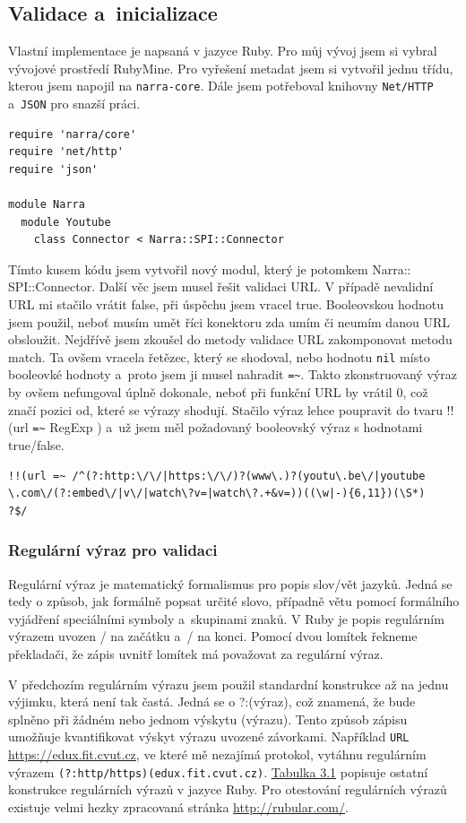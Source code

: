 \subsection{Validace a~inicializace}
\par Vlastní implementace je napsaná v jazyce Ruby. Pro můj vývoj jsem si vybral vývojové prostředí RubyMine. Pro vyřešení metadat jsem si vytvořil jednu třídu, kterou jsem napojil na \texttt{narra-core}. Dále jsem potřeboval knihovny \texttt{Net/HTTP} a~\texttt{JSON} pro snazší práci.
\begin{verbatim}
require 'narra/core'
require 'net/http'
require 'json'

module Narra
  module Youtube
    class Connector < Narra::SPI::Connector
\end{verbatim}
\par Tímto kusem kódu jsem vytvořil nový modul, který je potomkem Narra::\\SPI::Connector. Další věc jsem musel řešit validaci URL. V případě nevalidní URL mi stačilo vrátit false, při úspěchu jsem vracel true. Booleovskou hodnotu jsem použil, neboť musím umět říci konektoru zda umím či neumím danou URL obsloužit. Nejdřívě jsem zkoušel do metody validace URL zakomponovat metodu match. Ta ovšem vracela řetězec, který se shodoval, nebo hodnotu \texttt{nil} místo booleovké hodnoty a~proto jsem ji musel nahradit \verb|=~|. Takto zkonstruovaný výraz by ovšem nefungoval úplně dokonale, neboť při funkční URL by vrátil 0, což značí pozici od, které se výrazy shodují. Stačilo výraz lehce poupravit do tvaru !!(url \verb|=~| RegExp ) a~už jsem měl požadovaný booleovský výraz s hodnotami true/false.
\begin{verbatim}
!!(url =~ /^(?:http:\/\/|https:\/\/)?(www\.)?(youtu\.be\/|youtube
\.com\/(?:embed\/|v\/|watch\?v=|watch\?.+&v=))((\w|-){6,11})(\S*)
?$/
\end{verbatim}
\subsubsection{Regulární výraz pro validaci}
\par Regulární výraz\cite{regexp} je matematický formalismus pro popis slov/vět jazyků. Jedná se tedy o způsob, jak formálně popsat určité slovo, případně větu pomocí formálního vyjádření speciálními symboly a~skupinami znaků. V Ruby\cite{ruby} je popis regulárním výrazem uvozen / na začátku a~/ na konci. Pomocí dvou lomítek řekneme překladači, že zápis uvnitř lomítek má považovat za regulární výraz.
\par V předchozím regulárním výrazu jsem použil standardní konstrukce až na jednu výjimku, která není tak častá. Jedná se o ?:(výraz), což znamená, že bude splněno při žádném nebo jednom výskytu (výrazu). Tento způsob zápisu umožňuje kvantifikovat výskyt výrazu uvozené závorkami. Například \texttt{URL} \url{https://edux.fit.cvut.cz}, ve které mě nezajímá protokol, vytáhnu regulárním výrazem \texttt{(?:http/https)(edux.fit.cvut.cz)}. \hyperlink{regtable}{Tabulka 3.1} popisuje ostatní konstrukce regulárních výrazů v jazyce Ruby. Pro otestování regulárních výrazů existuje velmi hezky zpracovaná stránka \url{http://rubular.com/}\cite{michaellovitt}.

